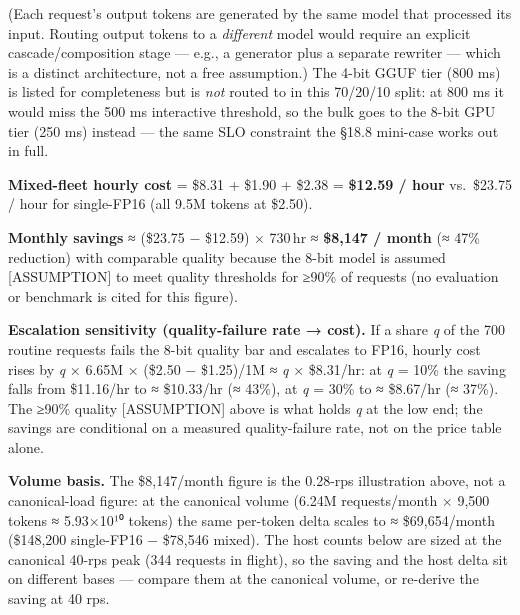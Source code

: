 (Each request's output tokens are generated by the same model that
processed its input. Routing output tokens to a \emph{different} model
would require an explicit cascade/composition stage --- e.g., a
generator plus a separate rewriter --- which is a distinct architecture,
not a free assumption.) The 4-bit GGUF tier (800 ms) is listed for
completeness but is \emph{not} routed to in this 70/20/10 split: at 800
ms it would miss the 500 ms interactive threshold, so the bulk goes to
the 8-bit GPU tier (250 ms) instead --- the same SLO constraint the
§18.8 mini-case works out in full.

\textbf{Mixed-fleet hourly cost} = \$8.31 + \$1.90 + \$2.38 =
\textbf{\$12.59 / hour} vs.~\$23.75 / hour for single-FP16 (all 9.5M
tokens at \$2.50).

\textbf{Monthly savings} ≈ (\$23.75 − \$12.59) × 730\,hr ≈
\textbf{\$8,147 / month} (≈ 47\% reduction) with comparable quality
because the 8-bit model is assumed \mbox{{[}ASSUMPTION{]}} to meet quality
thresholds for ≥90\% of requests (no evaluation or benchmark is cited
for this figure).

\textbf{Escalation sensitivity (quality-failure rate → cost).} If a
share \emph{q} of the 700 routine requests fails the 8-bit quality bar
and escalates to FP16, hourly cost rises by \emph{q} × 6.65M × (\$2.50 −
\$1.25)/1M ≈ \emph{q} × \$8.31/hr: at \emph{q} = 10\% the saving falls
from \$11.16/hr to ≈ \$10.33/hr (≈ 43\%), at \emph{q} = 30\% to ≈
\$8.67/hr (≈ 37\%). The ≥90\% quality \mbox{{[}ASSUMPTION{]}} above is what
holds \emph{q} at the low end; the savings are conditional on a measured
quality-failure rate, not on the price table alone.

\textbf{Volume basis.} The \$8,147/month figure is the 0.28-rps
illustration above, not a canonical-load figure: at the canonical volume
(6.24M requests/month × 9,500 tokens ≈ 5.93×10¹⁰ tokens) the same
per-token delta scales to ≈ \$69,654/month (\$148,200 single-FP16 −
\$78,546 mixed). The host counts below are sized at the canonical 40-rps
peak (344 requests in flight), so the saving and the host delta sit on
different bases --- compare them at the canonical volume, or re-derive
the saving at 40 rps.


